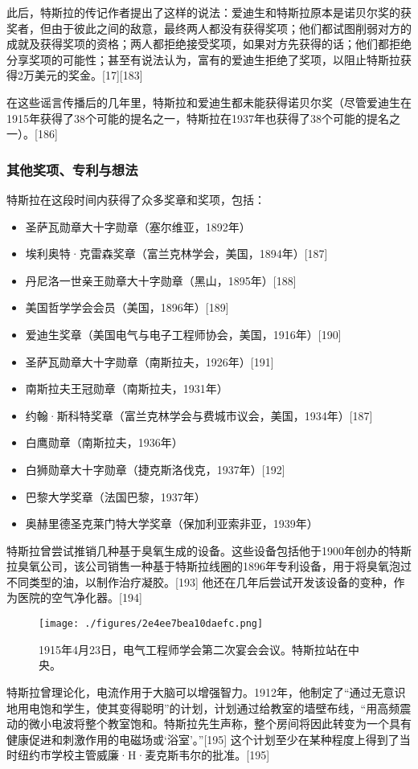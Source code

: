 此后，特斯拉的传记作者提出了这样的说法：爱迪生和特斯拉原本是诺贝尔奖的获奖者，但由于彼此之间的敌意，最终两人都没有获得奖项；他们都试图削弱对方的成就及获得奖项的资格；两人都拒绝接受奖项，如果对方先获得的话；他们都拒绝分享奖项的可能性；甚至有说法认为，富有的爱迪生拒绝了奖项，以阻止特斯拉获得2万美元的奖金。[17][183]

在这些谣言传播后的几年里，特斯拉和爱迪生都未能获得诺贝尔奖（尽管爱迪生在1915年获得了38个可能的提名之一，特斯拉在1937年也获得了38个可能的提名之一）。[186]
\subsubsection{其他奖项、专利与想法}  
特斯拉在这段时间内获得了众多奖章和奖项，包括：
\begin{itemize}
\item 圣萨瓦勋章大十字勋章（塞尔维亚，1892年）
\item 埃利奥特·克雷森奖章（富兰克林学会，美国，1894年）[187]
\item 丹尼洛一世亲王勋章大十字勋章（黑山，1895年）[188]
\item 美国哲学学会会员（美国，1896年）[189]
\item 爱迪生奖章（美国电气与电子工程师协会，美国，1916年）[190]
\item 圣萨瓦勋章大十字勋章（南斯拉夫，1926年）[191]
\item 南斯拉夫王冠勋章（南斯拉夫，1931年）
\item 约翰·斯科特奖章（富兰克林学会与费城市议会，美国，1934年）[187]
\item 白鹰勋章（南斯拉夫，1936年）
\item 白狮勋章大十字勋章（捷克斯洛伐克，1937年）[192]
\item 巴黎大学奖章（法国巴黎，1937年）
\item 奥赫里德圣克莱门特大学奖章（保加利亚索非亚，1939年）
\end{itemize}
特斯拉曾尝试推销几种基于臭氧生成的设备。这些设备包括他于1900年创办的特斯拉臭氧公司，该公司销售一种基于特斯拉线圈的1896年专利设备，用于将臭氧泡过不同类型的油，以制作治疗凝胶。[193] 他还在几年后尝试开发该设备的变种，作为医院的空气净化器。[194]
\begin{figure}[ht]
\centering
\texttt{[image: ./figures/2e4ee7bea10daefc.png]}
\caption{1915年4月23日，电气工程师学会第二次宴会会议。特斯拉站在中央。} \label{fig_Tesla_15}
\end{figure}
特斯拉曾理论化，电流作用于大脑可以增强智力。1912年，他制定了“通过无意识地用电饱和学生，使其变得聪明”的计划，计划通过给教室的墙壁布线，“用高频震动的微小电波将整个教室饱和。特斯拉先生声称，整个房间将因此转变为一个具有健康促进和刺激作用的电磁场或‘浴室’。”[195] 这个计划至少在某种程度上得到了当时纽约市学校主管威廉·H·麦克斯韦尔的批准。[195]

